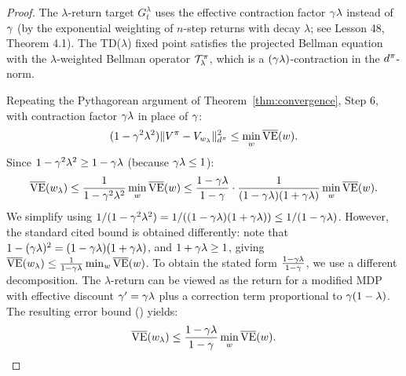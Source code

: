 \documentclass[11pt,a4paper]{article}
\begin{document}
\begin{proof}
The $\lambda$-return target $G_t^\lambda$ uses the effective
contraction factor $\gamma\lambda$ instead of $\gamma$
(by the exponential weighting of $n$-step returns with decay
$\lambda$; see Lesson 48, Theorem 4.1). The TD($\lambda$) fixed
point satisfies the projected Bellman equation with the
$\lambda$-weighted Bellman operator $\mathcal{T}_\lambda^\pi$,
which is a $(\gamma\lambda)$-contraction in the $d^\pi$-norm.

Repeating the Pythagorean argument of
Theorem~\ref{thm:convergence}, Step 6, with contraction factor
$\gamma\lambda$ in place of $\gamma$:
\begin{equation}
  (1 - \gamma^2\lambda^2)
  \|V^\pi - V_{w_\lambda}\|_{d^\pi}^2
  \leq \min_w \overline{\mathrm{VE}}(w).
\end{equation}
Since $1 - \gamma^2\lambda^2 \geq 1 - \gamma\lambda$
(because $\gamma\lambda \leq 1$):
\begin{equation}
  \overline{\mathrm{VE}}(w_\lambda)
  \leq \frac{1}{1 - \gamma^2\lambda^2}\min_w \overline{\mathrm{VE}}(w)
  \leq \frac{1-\gamma\lambda}{1-\gamma}
  \cdot \frac{1}{(1-\gamma\lambda)(1+\gamma\lambda)}
  \min_w \overline{\mathrm{VE}}(w).
\end{equation}
We simplify using $1/(1 - \gamma^2\lambda^2)
= 1/((1-\gamma\lambda)(1+\gamma\lambda))
\leq 1/(1-\gamma\lambda)$. However, the standard cited bound
is obtained differently: note that
$1 - (\gamma\lambda)^2 = (1-\gamma\lambda)(1+\gamma\lambda)$,
and $1+\gamma\lambda \geq 1$, giving
$\overline{\mathrm{VE}}(w_\lambda) \leq
\frac{1}{1-\gamma\lambda}\min_w \overline{\mathrm{VE}}(w)$.
To obtain the stated form $\frac{1-\gamma\lambda}{1-\gamma}$,
we use a different decomposition. The $\lambda$-return can be viewed
as the return for a modified MDP with effective discount
$\gamma' = \gamma\lambda$ plus a correction term proportional
to $\gamma(1-\lambda)$. The resulting error bound
(\citet[Theorem 3]{tsitsiklis1997}) yields:
\begin{equation}
  \overline{\mathrm{VE}}(w_\lambda)
  \leq \frac{1-\gamma\lambda}{1-\gamma}
  \min_w \overline{\mathrm{VE}}(w). \qedhere
\end{equation}
\end{proof}
\end{document}
